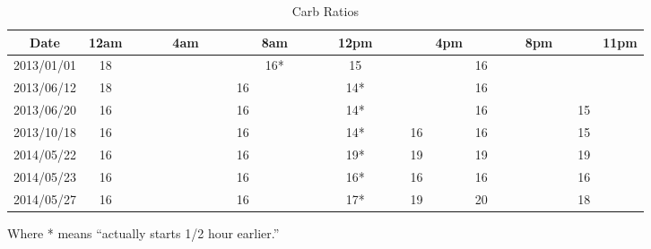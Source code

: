 \begin{table}[h]
\caption{Carb Ratios}
\footnotesize
\begin{center}
\begin{tabular}{|c|c|c|c|c|c|c|c|c|c|c|c|c|c|c|c|c|c|c|c|c|c|c|c|c|}
\hline
Date       & 12am & & & & 4am & & &    & 8am & & & & 12pm & & &    & 4pm &    & & & 8pm & &    & 11pm \\ \hline
2013/01/01 & 18   & & & &     & & &    & 16* & & & & 15   & & &    &     & 16 & & &     & &    &      \\
2013/06/12 & 18   & & & &     & & & 16 &     & & & & 14*  & & &    &     & 16 & & &     & &    &      \\
2013/06/20 & 16   & & & &     & & & 16 &     & & & & 14*  & & &    &     & 16 & & &     & & 15 &      \\
2013/10/18 & 16   & & & &     & & & 16 &     & & & & 14*  & & & 16 &     & 16 & & &     & & 15 &      \\
2014/05/22 & 16   & & & &     & & & 16 &     & & & & 19*  & & & 19 &     & 19 & & &     & & 19 &      \\
2014/05/23 & 16   & & & &     & & & 16 &     & & & & 16*  & & & 16 &     & 16 & & &     & & 16 &      \\
2014/05/27 & 16   & & & &     & & & 16 &     & & & & 17*  & & & 19 &     & 20 & & &     & & 18 &      \\
\hline
\end{tabular}
\end{center}
\label{default}
\end{table}%
Where * means ``actually starts 1/2 hour earlier.''

